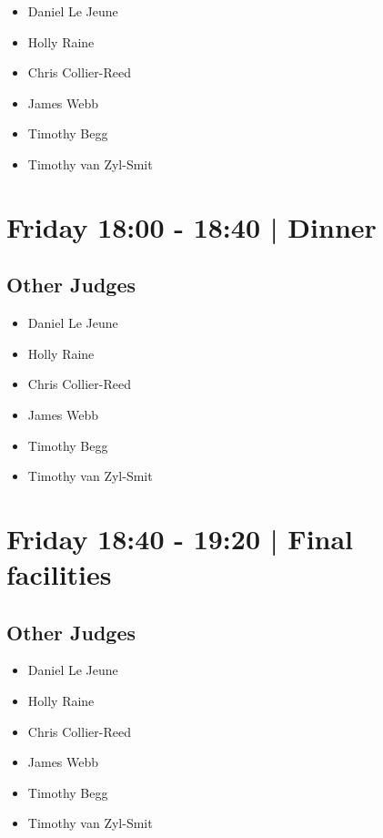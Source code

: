 \documentclass[10pt]{article}
\begin{document}
            \begin{itemize}
                            \item Daniel Le Jeune
                            \item Holly Raine
                            \item Chris Collier-Reed
                            \item James Webb
                            \item Timothy Begg
                            \item Timothy van Zyl-Smit
                        \end{itemize}
        

            \section*{Friday 18:00
        -
        18:40
        |
         Dinner }
        
                
        \subsection*{Other Judges}
        
            \begin{itemize}
                            \item Daniel Le Jeune
                            \item Holly Raine
                            \item Chris Collier-Reed
                            \item James Webb
                            \item Timothy Begg
                            \item Timothy van Zyl-Smit
                        \end{itemize}
        

            \section*{Friday 18:40
        -
        19:20
        |
         Final facilities}
        
                
        \subsection*{Other Judges}
        
            \begin{itemize}
                            \item Daniel Le Jeune
                            \item Holly Raine
                            \item Chris Collier-Reed
                            \item James Webb
                            \item Timothy Begg
                            \item Timothy van Zyl-Smit
                        \end{itemize}
        
\end{document}
